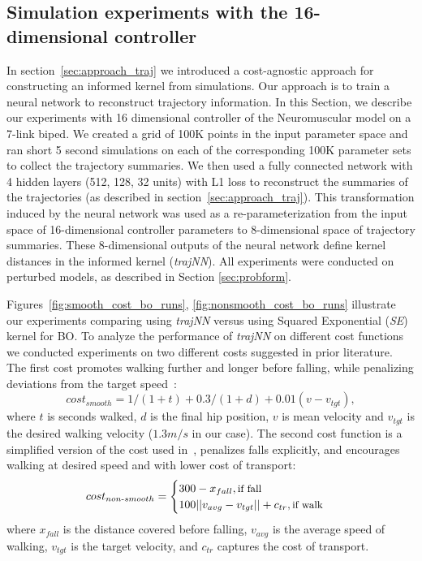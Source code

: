 \subsection{Simulation experiments with the 16-dimensional controller}
\label{experiments_nm}

In section~\ref{sec:approach_traj} we introduced a cost-agnostic approach for constructing an informed kernel from simulations. Our approach is to train a neural network to reconstruct trajectory information. In this Section, we describe our experiments with 16 dimensional controller of the Neuromuscular model on a 7-link biped. We created a grid of 100K points in the input parameter space  and ran short 5 second simulations on each of the corresponding 100K parameter sets to collect the trajectory summaries. We then used a fully connected network with 4 hidden layers (512, 128, 32 units) with L1 loss to reconstruct the summaries of the trajectories (as described in section~\ref{sec:approach_traj}). This transformation induced by the neural network was used as a re-parameterization from the input space of 16-dimensional controller parameters to 8-dimensional space of trajectory summaries. These 8-dimensional outputs of the neural network define kernel distances in the informed kernel (\textit{trajNN}). All experiments were conducted on perturbed models, as described in Section \ref{sec:probform}.

Figures~\ref{fig:smooth_cost_bo_runs}, \ref{fig:nonsmooth_cost_bo_runs} illustrate our experiments comparing using \textit{trajNN} versus using Squared Exponential (\textit{SE}) kernel for BO. To analyze the performance of \textit{trajNN} on different cost functions we conducted experiments on two different costs suggested in prior literature. The first cost promotes walking further and longer before falling, while penalizing deviations from the target speed~\citep{rai2016sample}:
\begin{equation}
cost_{smooth} = 1/(1+t) + 0.3/(1+d) + 0.01(v-v_{tgt}),
\label{eq:cost_smooth}
\end{equation}
where $t$ is seconds walked, $d$ is the final hip position, $v$ is mean velocity and $v_{tgt}$ is the desired walking velocity ($1.3m/s$ in our case). 
The second cost function is a simplified version of the cost used in~\cite{song2015neural}, penalizes falls explicitly, and encourages walking at desired speed and with lower cost of transport:
\begin{equation}
cost_{non\text{-}smooth} = 		
    \begin{cases}
		300 - x_{fall} , \text{\small{if fall}} \\
		100 ||v_{avg} - v_{tgt}|| + c_{tr}, \text{\small{if walk}}\\
	\end{cases}
\label{eq:cost_nonsmooth}
\end{equation}
where $x_{fall}$ is the distance covered before falling, $v_{avg}$ is the average speed of walking, $v_{tgt}$ is the target velocity, and $c_{tr}$ captures the cost of transport.

